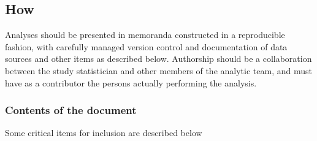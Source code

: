 \documentclass[]{book}
\theoremstyle{definition}
\theoremstyle{definition}
\theoremstyle{definition}
\theoremstyle{remark}
\begin{document}
\subsection{How}\label{how-4}

Analyses should be presented in memoranda constructed in a reproducible
fashion, with carefully managed version control and documentation of
data sources and other items as described below. Authorship should be a
collaboration between the study statistician and other members of the
analytic team, and must have as a contributor the persons actually
performing the analysis.

\hypertarget{contents-of-the-document-1}{\subsubsection{Contents of the
document}\label{contents-of-the-document-1}}

Some critical items for inclusion are described below
\end{document}
